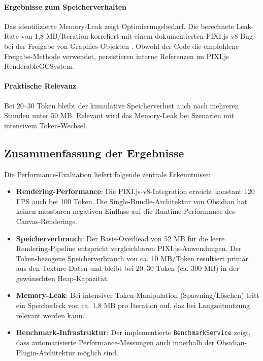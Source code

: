 \paragraph{Ergebnisse zum Speicherverhalten}
Das identifizierte Memory-Leak zeigt Optimierungsbedarf. Die berechnete Leak-Rate von 1,8 \ac{MB}/Iteration korreliert mit einem dokumentierten PIXI.js v8 Bug bei der Freigabe von Graphics-Objekten \autocite{PixiIssue10586}. Obwohl der Code die empfohlene Freigabe-Methode verwendet, persistieren interne Referenzen im PIXI.js RenderableGCSystem.

\paragraph{Praktische Relevanz}
Bei 20--30 Token bleibt der kumulative Speicherverlust auch nach mehreren Stunden unter 50 \ac{MB}. Relevant wird das Memory-Leak bei Szenarien mit intensivem Token-Wechsel.

\subsection{Zusammenfassung der Ergebnisse}

Die Performance-Evaluation liefert folgende zentrale Erkenntnisse:

\begin{itemize}
	\item \textbf{Rendering-Performance}: Die PIXI.js-v8-Integration erreicht konstant 120 \ac{FPS} auch bei 100 Token. Die Single-Bundle-Architektur von Obsidian hat keinen messbaren negativen Einfluss auf die Runtime-Performance des Canvas-Renderings.

	\item \textbf{Speicherverbrauch}: Der Basis-Overhead von 52 \ac{MB} für die leere Rendering-Pipeline entspricht vergleichbaren PIXI.js-Anwendungen. Der Token-bezogene Speicherverbrauch von ca. 10 \ac{MB}/Token resultiert primär aus den Texture-Daten und bleibt bei 20--30 Token (ca. 300 \ac{MB}) in der gewünschten Heap-Kapazität.

	\item \textbf{Memory-Leak}: Bei intensiver Token-Manipulation (Spawning/Löschen) tritt ein Speicherleck von ca. 1,8 \ac{MB} pro Iteration auf, das bei Langzeitnutzung relevant werden kann.

	\item \textbf{Benchmark-Infrastruktur}: Der implementierte \texttt{BenchmarkService} zeigt, dass automatisierte Performance-Messungen auch innerhalb der Obsidian-Plugin-Architektur möglich sind.
\end{itemize}

